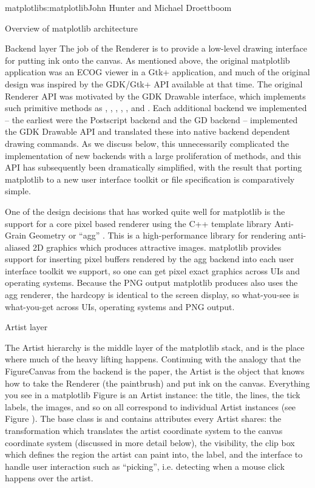 \begin{aosachapter}{matplotlib}{s:matplotlib}{John Hunter and Michael Droettboom}
\begin{aosasect1}{Overview of matplotlib architecture}
\begin{aosasect2}{Backend layer}
The job of the Renderer is to provide a low-level drawing interface
for putting ink onto the canvas.  As mentioned above, the original
matplotlib application was an ECOG viewer in a Gtk+ application, and
much of the original design was inspired by the GDK/Gtk+ API available
at that time.  The original Renderer API was motivated by the GDK
Drawable interface, which implements such primitive methods as
, , ,
, , and .  Each
additional backend we implemented -- the earliest were the Postscript
backend and the GD backend -- implemented the GDK Drawable API and
translated these into native backend dependent drawing commands.  As
we discuss below, this unnecessarily complicated the implementation of
new backends with a large proliferation of methods, and this API has
subsequently been dramatically simplified, with the result that
porting matplotlib to a new user interface toolkit or file
specification is comparatively simple.

One of the design decisions that has worked quite well for matplotlib
is the support for a core pixel based renderer using the C++ template
library Anti-Grain Geometry or ``agg'' \cite{bib:agg}.  This is a
high-performance library for rendering anti-aliased 2D graphics which
produces attractive images.  matplotlib provides support for inserting
pixel buffers rendered by the agg backend into each user interface
toolkit we support, so one can get pixel exact graphics across UIs and
operating systems.  Because the PNG output matplotlib produces also
uses the agg renderer, the hardcopy is identical to the screen
display, so what-you-see is what-you-get across UIs, operating systems
and PNG output.

\end{aosasect2}

\begin{aosasect2}{Artist layer}

The Artist hierarchy is the middle layer of the matplotlib stack, and
is the place where much of the heavy lifting happens.  Continuing with
the analogy that the FigureCanvas from the backend is the paper, the
Artist is the object that knows how to take the Renderer (the
paintbrush) and put ink on the canvas.  Everything you see in a
matplotlib Figure is an Artist instance: the title, the lines, the
tick labels, the images, and so on all correspond to individual Artist
instances (see Figure \cite{fig.matplotlib.artists_tree}).  The base
class is  and contains attributes every
Artist shares: the transformation which translates the artist
coordinate system to the canvas coordinate system (discussed in more
detail below), the visibility, the clip box which defines the region
the artist can paint into, the label, and the interface to handle user
interaction such as ``picking'', i.e. detecting when a mouse click
happens over the artist.


\end{aosasect2}
\end{aosasect1}
\end{aosachapter}
